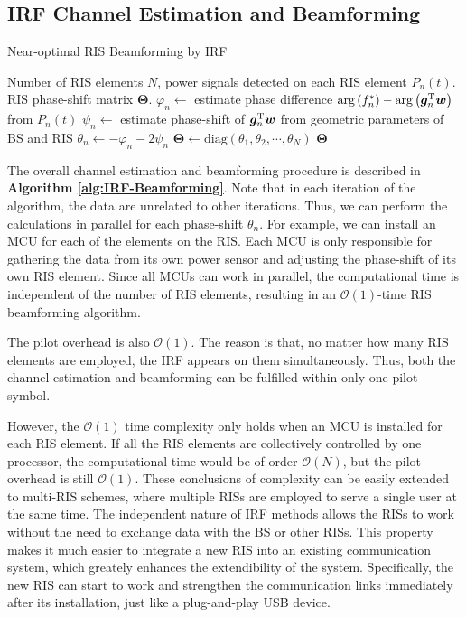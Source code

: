 \documentclass[12pt,draftclsnofoot,journal,onecolumn]{IEEEtran}
\theoremstyle{nonumberplain}
\def \diag {\text{diag}}
\def \arg {\text{arg}}
\begin{document}
\subsection{IRF Channel Estimation and Beamforming}
    \begin{algorithm}[H] 
        \caption{Near-optimal RIS Beamforming by IRF} \label{alg:IRF-Beamforming}
        \begin{algorithmic}[1]
            \REQUIRE Number of RIS elements $N$, power signals detected on each RIS element $P_n(t)$.
            \ENSURE RIS phase-shift matrix ${\bm \Theta}$.
                \STATE $\varphi_n \leftarrow$ estimate phase difference  $\arg\left(f_{n}^{*}\right)-\arg\left(\bm g_{n}^{\rm T}\bm w\right)$ from $P_n(t)$
                \STATE $\psi_{n} \leftarrow$ estimate phase-shift of $\bm g_{n}^{\rm T}\bm w$ from geometric parameters of BS and RIS
                \STATE $\theta_n \leftarrow -\varphi_n - 2\psi_n$
            \ENDFOR
            \STATE ${\bm \Theta} \leftarrow \diag(\theta_1, \theta_2, \cdots, \theta_N)$
            \RETURN ${\bm \Theta}$
        \end{algorithmic}
    \end{algorithm}
    The overall channel estimation and beamforming procedure is described in {\bf Algorithm \ref{alg:IRF-Beamforming}}. Note that in each iteration of the algorithm, the data are unrelated to other iterations. Thus, we can perform the calculations in parallel for each phase-shift $\theta_n$. For example, we can install an MCU for each of the elements on the RIS. Each MCU is only responsible for gathering the data from its own power sensor and adjusting the phase-shift of its own RIS element. Since all MCUs can work in parallel, the computational time is independent of the number of RIS elements, resulting in an $\mathcal{O}(1)$-time RIS beamforming algorithm. 

    The pilot overhead is also $\mathcal{O}(1)$. The reason is that, no matter how many RIS elements are employed, the IRF appears on them simultaneously. Thus, both the channel estimation and beamforming can be fulfilled within only one pilot symbol. 

    However, the $\mathcal{O}(1)$ time complexity only holds when an MCU is installed for each RIS element. If all the RIS elements are collectively controlled by one processor, the computational time would be of order $\mathcal{O}(N)$, but the pilot overhead is still $\mathcal{O}(1)$. These conclusions of complexity can be easily extended to multi-RIS schemes, where multiple RISs are employed to serve a single user at the same time. The independent nature of IRF methods allows the RISs to work without the need to exchange data with the BS or other RISs. This property makes it much easier to integrate a new RIS into an existing communication system, which greately enhances the extendibility of the system. Specifically, the new RIS can start to work and strengthen the communication links immediately after its installation, just like a plug-and-play USB device. 
\end{document}
